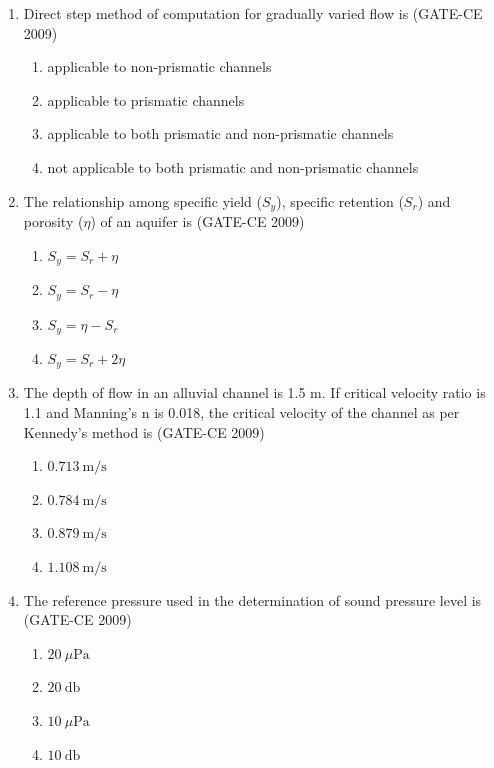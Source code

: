 \documentclass[journal,12pt,onecolumn]{article}
\theoremstyle{remark}
\begin{document}
\begin{enumerate}
    \item Direct step method of computation for gradually varied flow is (GATE-CE 2009)
    \begin{enumerate}
        \item applicable to non-prismatic channels
        \item applicable to prismatic channels
        \item applicable to both prismatic and non-prismatic channels
        \item not applicable to both prismatic and non-prismatic channels
    \end{enumerate}
    
    \item The relationship among specific yield ($S_y$), specific retention ($S_r$) and porosity ($\eta$) of an aquifer is (GATE-CE 2009)
    \begin{enumerate}
        \item $S_y = S_r + \eta$ 
         \item $S_y = S_r - \eta$ 
        \item $S_y = \eta - S_r$ 
        \item $S_y = S_r + 2\eta$
    \end{enumerate}
    
    \item The depth of flow in an alluvial channel is 1.5 m. If critical velocity ratio is 1.1 and Manning's n is 0.018, the critical velocity of the channel as per Kennedy's method is (GATE-CE 2009)
    \begin{enumerate}
        \item $0.713~\mathrm{m/s}$
        \item $0.784~\mathrm{m/s}$
        \item $0.879~\mathrm{m/s}$
        \item $1.108~\mathrm{m/s}$
    \end{enumerate}
    
    \item The reference pressure used in the determination of sound pressure level is (GATE-CE 2009)
    \begin{enumerate}
        \item $20~\mu\mathrm{Pa}$
        \item $20~\mathrm{db}$
        \item $10~\mu\mathrm{Pa}$
        \item $10~\mathrm{db}$
    \end{enumerate}
    

\end{enumerate}
\end{document}
